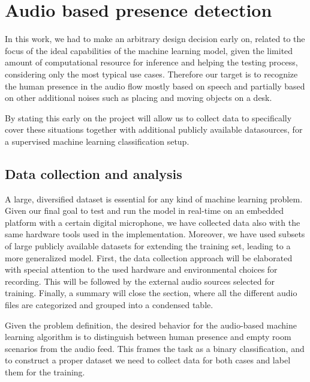\chapter{Audio based presence detection}

In this work, we had to make an arbitrary design decision early on, related to the focus of the ideal capabilities of the machine learning model, given the limited amount of computational resource for inference and helping the testing process, considering only the most typical use cases. Therefore our target is to recognize the human presence in the audio flow mostly based on speech and partially based on other additional noises such as placing and moving objects on a desk. 


By stating this early on the project will allow us to collect data to specifically cover these situations together with additional publicly available datasources, for a supervised machine learning classification setup.



\section{Data collection and analysis}

A large, diversified dataset is essential for any kind of machine learning problem. Given our final goal to test and run the model in real-time on an embedded platform with a certain digital microphone, we have collected data also with the same hardware tools used in the implementation. Moreover, we have used subsets of large publicly available datasets for extending the training set, leading to a more generalized model. First, the data collection approach will be elaborated with special attention to the used hardware and environmental choices for recording. This will be followed by the external audio sources selected for training. Finally, a summary will close the section, where all the different audio files are categorized and grouped into a condensed table.

Given the problem definition, the desired behavior for the audio-based machine learning algorithm is to distinguish between human presence and empty room scenarios from the audio feed. This frames the task as a binary classification, and to construct a proper dataset we need to collect data for both cases and label them for the training.


